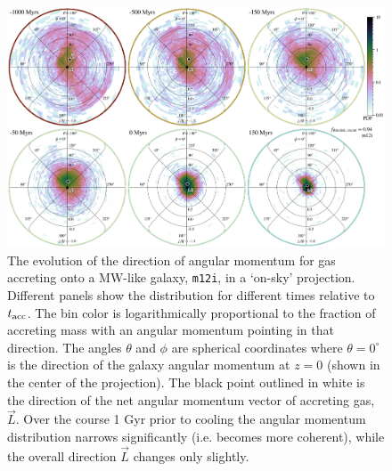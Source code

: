 \documentclass[fleqn,usenatbib]{mnras}
\newcommand{\tacc}{t_{\rm acc}}
\begin{document}
\begin{figure}
    \centering
    \includegraphics[width=\textwidth]{figures/on_sky/angular_momentum.png}
    \caption{
    The evolution of the direction of angular momentum for gas accreting onto a MW-like galaxy, \texttt{m12i}, in a `on-sky' projection.
    Different panels show the distribution for different times relative to $\tacc$.
    The bin color is logarithmically proportional to the fraction of accreting mass with an angular momentum pointing in that direction.
    The angles $\theta$ and $\phi$ are spherical coordinates where $\theta=0^\circ$ is the direction of the galaxy angular momentum at $z=0$ (shown in the center of the projection).
    The black point outlined in white is the direction of the net angular momentum vector of accreting gas, $\vec L$.
    Over the course 1 Gyr prior to cooling the angular momentum distribution narrows significantly (i.e. becomes more coherent), while the overall direction $\vec L$ changes only slightly.
    }
    \label{f: coherence -- on sky}
\end{figure}
\end{document}

